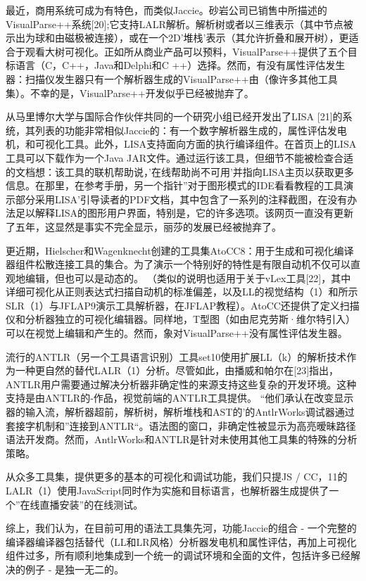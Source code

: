最近，商用系统可成为有特色，而类似Jaccie。砂岩公司已销售中所描述的VisualParse++系统[20];它支持LALR解析。解析树或者以三维表示（其中节点被示出为球和由磁极被连接），或在一个2D'堆栈'表示（其允许折叠和展开树），更适合于观看大树可视化。正如所从商业产品可以预料，VisualParse++提供了五个目标语言（C，C++，Java和Delphi和C ++）选择。然而，有没有属性评估发生器：扫描仪发生器只有一个解析器生成的VisualParse++由（像许多其他工具集）。不幸的是，VisualParse++开发似乎已经被抛弃了。

从马里博尔大学与国际合作伙伴共同的一个研究小组已经开发出了LISA [21]的系统，其列表的功能非常相似Jaccie的：有一个数字解析器生成的，属性评估发电机，和可视化工具。此外，LISA支持面向方面的执行编译组件。在首页上的LISA工具可以下载作为一个Java JAR文件。通过运行该工具，但细节不能被检查合适的文档想：该工具的联机帮助说，'在线帮助尚不可用'并指向LISA主页以获取更多信息。在那里，在参考手册，另一个指针''对于图形模式的IDE看看教程的工具演示部分采用LISA'引导读者的PDF文档，其中包含了一系列的注释截图，在没有办法足以解释LISA的图形用户界面，特别是，它的许多选项。该网页一直没有更新了五年，这显然是事实不完全显示，丽莎的发展已经被抛弃了。


更近期，Hielscher和Wagenknecht创建的工具集AtoCC8：用于生成和可视化编译器组件松散连接工具的集合。为了演示一个特别好的特性是有限自动机不仅可以直观地编辑，但也可以是动态的。 （类似的说明也适用于关于vLex工具[22]，其中详细可视化从正则表达式扫描自动机的标准偏差，以及LL的视觉结构（1）和所示SLR（1）与JFLAP9演示工具解析器，在JFLAP教程）。AtoCC还提供了定义扫描仪和分析器独立的可视化编辑器。同样地，T型图（如由尼克劳斯·维尔特引入）可以在视觉上编辑和产生的。然而，象对VisualParse++没有属性评估发生器。

流行的ANTLR（另一个工具语言识别）工具set10使用扩展LL（k）的解析技术作为一种更自然的替代LALR（1）分析。尽管如此，由播威和帕尔在[23]指出，ANTLR用户需要通过解决分析器非确定性的来源支持这些复杂的开发环境。这种支持是由ANTLR的-作品，视觉前端的ANTLR工具提供。 “他们承认在改变显示器的输入流，解析器超前，解析树，解析堆栈和AST的'的AntlrWorks调试器通过套接字机制和”连接到ANTLR“。语法图的窗口，非确定性被显示为高亮暧昧路径语法开发商。然而，AntlrWorks和ANTLR是针对未使用其他工具集的特殊的分析策略。

从众多工具集，提供更多的基本的可视化和调试功能，我们只提JS / CC，11的LALR（1）使用JavaScript同时作为实施和目标语言，也解析器生成提供了一个''在线直播安装''的在线测试。

综上，我们认为，在目前可用的语法工具集先河，功能Jaccie的组合 - 一个完整的编译器编译器包括替代（LL和LR风格）分析器发电机和属性评估，再加上可视化组件过多，所有顺利地集成到一个统一的调试环境和全面的文件，包括许多已经解决的例子 - 是独一无二的。

